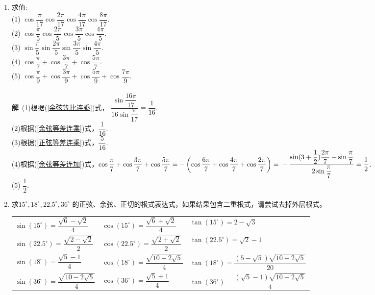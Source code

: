 \begin{enumerate}[label={\textbf{\arabic*.}},leftmargin=
    \inteval{\myenumleftmargin}pt]
\item 求值: \\
(1) $ \cos\dfrac{\pi}{17}\cos\dfrac{2\pi}{17}\cos\dfrac{4\pi}{17}
\cos\dfrac{8\pi}{17} $. \\
(2) $ \cos\dfrac{\pi}{5}\cos\dfrac{2\pi}{5}\cos\dfrac{3\pi}{5}
\cos\dfrac{4\pi}{5} $. \\
(3) $ \sin\dfrac{\pi}{5}\sin\dfrac{2\pi}{5}\sin\dfrac{3\pi}{5}
\sin\dfrac{4\pi}{5} $. \\
(4) $ \cos\dfrac{\pi}{7}+\cos\dfrac{3\pi}{7}+\cos\dfrac{5\pi}{7} $. \\
(5) $ \cos\dfrac{\pi}{9}+\cos\dfrac{3\pi}{9}+\cos\dfrac{5\pi}{9}+\cos\dfrac{7\pi}{9} $. \\
\ifteach \\ \textbf{解}\ 
(1)根据(\ref{余弦等比连乘})式，
$ \dfrac{\sin\dfrac{16\pi}{17}}{16\sin\dfrac{\pi}{17}}=\dfrac{1}{16} $. \\
(2)根据(\ref{余弦等差连乘})式，$ \dfrac{1}{16} $. \\
(3)根据(\ref{正弦等差连乘})式，$ \dfrac{5}{16} $. \\
(4)根据(\ref{余弦等差连加})式，$ \cos\dfrac{\pi}{7}+\cos\dfrac{3\pi}{7}+\cos\dfrac{5\pi}{7}=
-\left(\cos\dfrac{6\pi}{7}+\cos\dfrac{4\pi}{7}+\cos\dfrac{2\pi}{7}\right)= \\
-\dfrac{\sin(3+\dfrac{1}{2})\dfrac{2\pi}{7}-\sin\dfrac{\pi}{7}}{2\sin\dfrac{\pi}{7}}=\dfrac{1}{2} $. \\
(5) $ \dfrac{1}{2} $. 
\fi

\item 求$ 15^{\circ},18^{\circ},22.5^{\circ},36^{\circ} $
的正弦、余弦、正切的根式表达式，如果结果包含二重根式，请尝试去掉外层根式。
\ifteach 
\begin{table}[h]
    \centering
    \begin{tabular}{l|l|l}
        $ \sin(15^{\circ})=\dfrac{\sqrt{6}-\sqrt{2}}{4} $ & 
        $ \cos(15^{\circ})=\dfrac{\sqrt{6}+\sqrt{2}}{4} $ & 
        $ \tan(15^{\circ})=2-\sqrt{3}$ \\ [9pt]
        $ \sin(22.5^{\circ})=\dfrac{\sqrt{2-\sqrt{2}}}{2} $ & 
        $\cos(22.5^{\circ})=\dfrac{\sqrt{2+\sqrt{2}}}{2}$ & 
        $ \tan(22.5^{\circ})=\sqrt{2}-1 $ \\ 
        [9pt]		
        $ \sin(18^{\circ})=\dfrac{\sqrt{5}-1}{4} $ & 
        $\cos(18^{\circ})=\dfrac{\sqrt{10+2\sqrt{5}}}{4} $ &
        $ \tan(18^{\circ})=\dfrac{\left(5-\sqrt{5}\right)
            \sqrt{10-2\sqrt{5}}}{20} $ \\ [9pt]	
        $ \sin(36^{\circ})=\dfrac{\sqrt{10-2\sqrt{5}}}{4} $ & $\cos(36^{\circ})=\dfrac{\sqrt{5}+1}{4} $ &
        $ \tan(36^{\circ})=\dfrac{\left(\sqrt{5}-1\right)
            \sqrt{10-2\sqrt{5}}}{4} $ \\ [9pt]
    \end{tabular} 
\end{table}
\fi


\end{enumerate}
